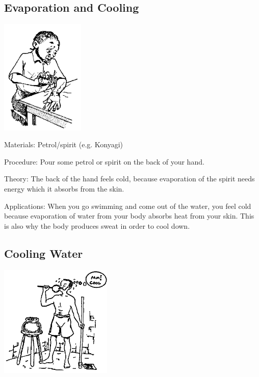 \begin{multicols}{2}
\subsection{Evaporation and Cooling}

\begin{center}
\includegraphics[width=0.3\textwidth]{./img/source/evap-cooling.png}
\end{center}

\begin{description*}
\item[Materials:]{Petrol/spirit (e.g. Konyagi)}
\item[Procedure:]{Pour some petrol or spirit on the back of your hand.}
\item[Theory:]{The back of the hand feels cold, because evaporation of the spirit needs energy which it absorbs from the skin.}
\item[Applications:]{When you go swimming and come out of the water, you feel cold because evaporation of water from your body absorbs heat from your skin. This is also why the body produces sweat in order to cool down.}
\end{description*}

\subsection{Cooling Water}

\begin{center}
\includegraphics[width=0.4\textwidth]{./img/source/cooling-water.png}
\end{center}


\end{multicols}
